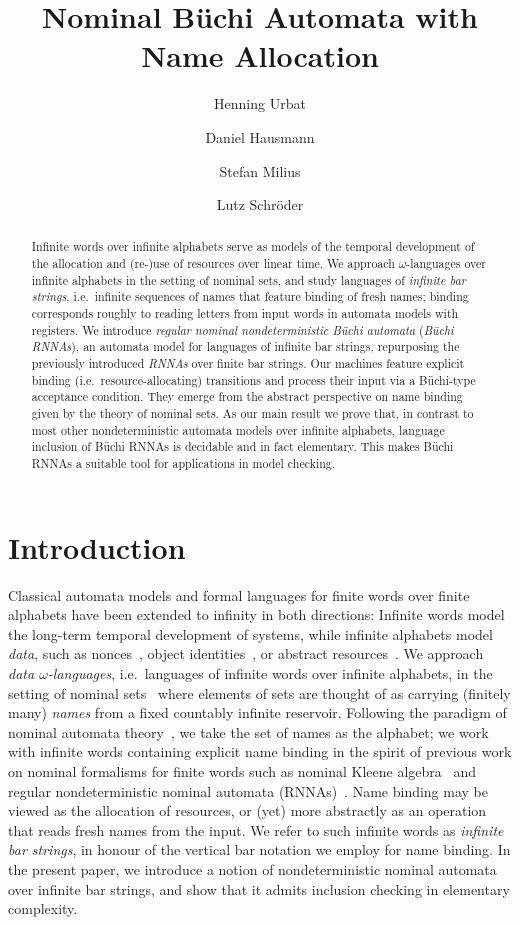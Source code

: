 \documentclass[final,a4paper,UKenglish,thm-restate,autoref,numberwithinsect]{lipics-v2021}
\title{Nominal Büchi Automata with Name Allocation}
\author{Henning Urbat}{Friedrich-Alexander-Universit\"at Erlangen-N\"urnberg, Germany}%
{henning.urbat@fau.de}%
{https://orcid.org/0000-0002-3265-7168}%
{Supported by Deutsche Forschungsgemeinschaft (DFG) under project SCHR~1118/15-1}
\author{Daniel Hausmann}{Gothenburg University, Sweden}%
{daniel.hausmann@fau.de}%
{https://orcid.org/0000-0002-0935-8602}%
{Supported by Deutsche Forschungsgemeinschaft (DFG) under project MI~717/7-1
and by the European Research Council (ERC) under project 772459}
\author{Stefan Milius}%
{Friedrich-Alexander-Universit\"at Erlangen-N\"urnberg, Germany}%
{mail@stefan-milius.eu}%
{https://orcid.org/0000-0002-2021-1644}%
{Supported by Deutsche Forschungsgemeinschaft (DFG) under project MI~717/7-1}
\author{Lutz Schr\"oder}{Friedrich-Alexander-Universit\"at Erlangen-N\"urnberg, Germany}%
{lutz.schroeder@fau.de}%
{https://orcid.org/0000-0002-3146-5906}%
{Supported by Deutsche Forschungsgemeinschaft (DFG) under project \mbox{SCHR~1118/15-1}}
\numberwithin{equation}{section}
\newcommand{\+}[1]{\mathcal{#1}\xspace}
\theoremstyle{definition}
\begin{document}
%
\maketitle
%
\begin{abstract}
Infinite words over infinite alphabets serve as models of the temporal development of the allocation and (re-)use of resources over linear time. We approach $\omega$-languages over infinite alphabets in the setting of nominal sets, and  study languages of \emph{infinite bar strings}, i.e.~infinite sequences of names that feature binding of fresh names; binding corresponds roughly to reading  letters from input words in automata models with registers. We introduce \emph{regular nominal nondeterministic Büchi automata} (\emph{Büchi RNNAs}), an automata model for languages of infinite bar strings, repurposing the previously introduced \emph{RNNAs} over finite bar strings. Our machines feature explicit binding (i.e.~resource-allocating) transitions and process their input via a Büchi-type acceptance condition. They emerge from the abstract perspective on name binding given by the theory of nominal sets. As our main result we prove that, in contrast to most other nondeterministic automata models over infinite alphabets, language inclusion of Büchi RNNAs is decidable and in fact elementary. This makes Büchi RNNAs a suitable tool for applications in model checking.
\end{abstract}
\newpage
\section{Introduction}\label{sec:intro}

Classical automata models and formal languages for finite words over
finite alphabets have been extended to infinity in both directions:
Infinite words model the long-term temporal development of systems,
while infinite alphabets model \emph{data}, such as
nonces~\cite{KurtzEA07}, object identities~\cite{GrigoreEA13}, or
abstract resources~\cite{CianciaSammartino14}. We approach \emph{data
  $\omega$-languages}, i.e.~languages of infinite words over infinite
alphabets, in the setting of nominal sets~\cite{Pitts13} where elements
of sets are thought of as carrying (finitely many) \emph{names} from a
fixed countably infinite reservoir. Following the paradigm of nominal
automata theory~\cite{BojanczykEA14}, we take the set of names as the
alphabet; we work with infinite words containing explicit name binding
in the spirit of previous work on nominal formalisms for finite words
such as nominal Kleene algebra~\cite{GabbayCiancia11} and regular
nondeterministic nominal automata (RNNAs)~\cite{SchroderEA17}. Name
binding may be viewed as the allocation of resources, or (yet) more
abstractly as an operation that reads fresh names from the input. We
refer to such infinite words as \emph{infinite bar strings}, in honour
of the vertical bar notation we employ for name binding. In the
present paper, we introduce a notion of nondeterministic nominal
automata over infinite bar strings, and show that it admits inclusion
checking in elementary complexity.
\end{document}
